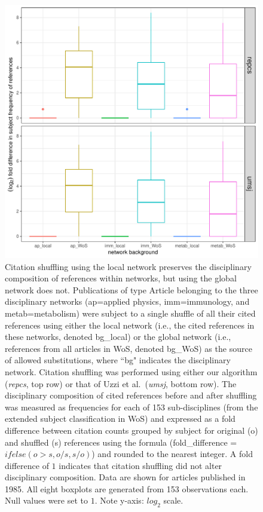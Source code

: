 \documentclass[NETN]{stjour}
\begin{document}
\begin{figure}%
\centering
\includegraphics[width=0.6\linewidth]{background-effect}     
\caption{Citation shuffling using the local network preserves the disciplinary composition of references within networks, but using the global network does not.  Publications of type Article belonging to the three disciplinary networks (ap=applied physics, imm=immunology, and  metab=metabolism) were subject to a single shuffle of all their cited references using either the local network (i.e., the cited references in these networks, denoted  bg\_local) or the global network (i.e., references from all articles in WoS, denoted bg\_WoS) as the source of allowed substitutions, where ``bg" indicates the disciplinary network. Citation shuffling was performed using either our algorithm (\emph{repcs}, top row)
 or that of Uzzi et al.~(\emph{umsj}, bottom row).
 The disciplinary composition of cited references before and after shuffling was measured as frequencies for each of 153 sub-disciplines (from the extended subject classification in WoS) and expressed as a fold difference between citation counts grouped by subject for original (o) and shuffled (s) references using the formula (fold\_difference = $ifelse(o > s, o/s, s/o)$) and rounded to the nearest integer. A fold difference of $1$ indicates that citation shuffling did not alter disciplinary composition. Data are shown for articles published in 1985. All eight boxplots are generated from 153 observations each. Null values were set to $1$. Note y-axis: $log_2$ scale.} 
\label{fig:be}
\end{figure}
\end{document}
